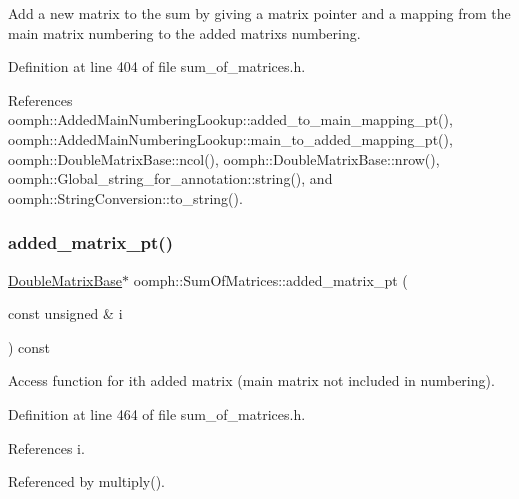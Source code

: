 Add a new matrix to the sum by giving a matrix pointer and a mapping from the main matrix numbering to the added matrix\textquotesingle{}s numbering. 



Definition at line 404 of file sum\+\_\+of\+\_\+matrices.\+h.



References oomph\+::\+Added\+Main\+Numbering\+Lookup\+::added\+\_\+to\+\_\+main\+\_\+mapping\+\_\+pt(), oomph\+::\+Added\+Main\+Numbering\+Lookup\+::main\+\_\+to\+\_\+added\+\_\+mapping\+\_\+pt(), oomph\+::\+Double\+Matrix\+Base\+::ncol(), oomph\+::\+Double\+Matrix\+Base\+::nrow(), oomph\+::\+Global\+\_\+string\+\_\+for\+\_\+annotation\+::string(), and oomph\+::\+String\+Conversion\+::to\+\_\+string().

\mbox{\label{classoomph_1_1SumOfMatrices_a4d305ca67acad2600f833accd4acf982}} 
\subsubsection{\texorpdfstring{added\+\_\+matrix\+\_\+pt()}{added\_matrix\_pt()}}
{\footnotesize\ttfamily \hyperlink{classoomph_1_1DoubleMatrixBase}{Double\+Matrix\+Base}$\ast$ oomph\+::\+Sum\+Of\+Matrices\+::added\+\_\+matrix\+\_\+pt (\begin{DoxyParamCaption}\item[{const unsigned \&}]{i }\end{DoxyParamCaption}) const\hspace{0.3cm}{\ttfamily [inline]}}

Access function for ith added matrix (main matrix not included in numbering). 

Definition at line 464 of file sum\+\_\+of\+\_\+matrices.\+h.



References i.



Referenced by multiply().

\mbox{\label{classoomph_1_1SumOfMatrices_ac9fbec5f36f904c4fee889fb0f628c2f}} 
